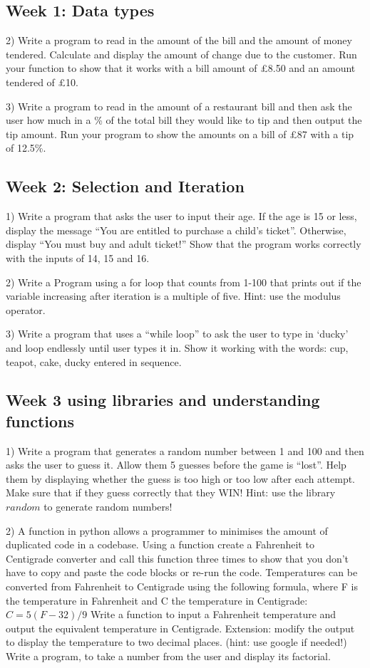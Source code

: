 \documentclass{article}
\begin{document}
	 \subsection{Week 1: Data types}
	 2) Write a program to read in the amount of the bill and the amount of money tendered. Calculate and display the amount of change due to the customer. Run your function to show that it works with a bill amount of £8.50 and an amount tendered of £10.
	 
	 3) Write a program to read in the amount of a restaurant bill and then ask the user how much in a \% of the total bill they would like to tip and then output the tip amount. Run your program to show the amounts on a bill of £87 with a tip of 12.5\%.
	 \subsection{Week 2: Selection and Iteration}
	 1) Write a program that asks the user to input their age. If the age is 15 or less, display the message “You are entitled to purchase a child’s ticket”. Otherwise, display “You must buy and adult ticket!” Show that the program works correctly with the inputs of 14, 15 and 16.
	 
	  2) Write a Program using a for loop that counts from 1-100 that prints out if the variable increasing after iteration is a multiple of five. Hint: use the modulus operator. 
	 
	 3) Write a program that uses a “while loop” to ask the user to type in ‘ducky’ and loop endlessly until user types it in. Show it working with the words: cup, teapot, cake, ducky entered in sequence.

	 \subsection{Week 3 using libraries and understanding functions}
	 1) Write a program that generates a random number between 1 and 100 and then asks the user to guess it. Allow them 5 guesses before the game is “lost”. Help them by displaying whether the guess is too high or too low after each attempt. Make sure that if they guess correctly that they WIN! Hint: use the library $random$ to generate random numbers! 
	  
	  2) A function in python allows a programmer to minimises the amount of duplicated code in a codebase. Using a function create a Fahrenheit to Centigrade converter and call this function three times to show that you don't have to copy and paste the code blocks or re-run the code. Temperatures can be converted from Fahrenheit to Centigrade using the following formula, where F is the temperature in Fahrenheit and C the temperature in Centigrade: $C = 5 (F-32) / 9$ Write a function to input a Fahrenheit temperature and output the equivalent temperature in Centigrade. Extension: modify the output to display the temperature to two decimal places. (hint: use google if needed!)
	 Write a program, to take a number from the user and display its factorial. 
	 
\end{document}
